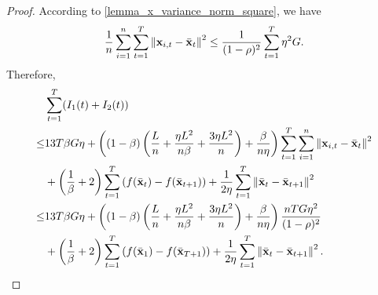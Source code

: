 \documentclass{article}
\begin{document}
\begin{proof}
According to \ref{lemma_x_variance_norm_square}, we have
\begin{align}
\nonumber
\frac{1}{n}\sum_{i=1}^n \sum_{t=1}^T \left\lVert{\bf x}_{i,t} - \bar{{\bf x}}_t\right\rVert^2 \le \frac{1}{(1-\rho)^2} \sum_{t=1}^T \eta^2 G.
\end{align} Therefore, 
\begin{align}
\nonumber
&\sum_{t=1}^T (I_1(t) + I_2(t)) \\ \nonumber
\le & 13T\beta G \eta + \left(  (1-\beta)  \left(  \frac{L}{n} + \frac{\eta L^2}{n\beta} + \frac{3\eta L^2}{n}  \right) + \frac{\beta}{n\eta}  \right)\sum_{t=1}^T\sum_{i=1}^n\left\lVert{\bf x}_{i,t} - \bar{{\bf x}}_t \right\rVert^2 \\ \nonumber 
&+ \left( \frac{1}{\beta} + 2 \right)\sum_{t=1}^T\left( f(\bar{{\bf x}}_t) - f(\bar{{\bf x}}_{t+1}) \right) + \frac{1}{2\eta}\sum_{t=1}^T\left\lVert \bar{{\bf x}}_t - \bar{{\bf x}}_{t+1}\right\rVert^2 \\ \nonumber
\le & 13T\beta G \eta + \left(  (1-\beta)  \left(  \frac{L}{n} + \frac{\eta L^2}{n\beta} + \frac{3\eta L^2}{n}  \right) + \frac{\beta}{n\eta}  \right) \frac{nT G \eta^2}{(1-\rho)^2} \\ \nonumber 
&+ \left( \frac{1}{\beta} + 2 \right)\sum_{t=1}^T\left( f(\bar{{\bf x}}_1) - f(\bar{{\bf x}}_{T+1}) \right) + \frac{1}{2\eta}\sum_{t=1}^T\left\lVert \bar{{\bf x}}_t - \bar{{\bf x}}_{t+1}\right\rVert^2.
\end{align}







\end{proof}
\end{document}
